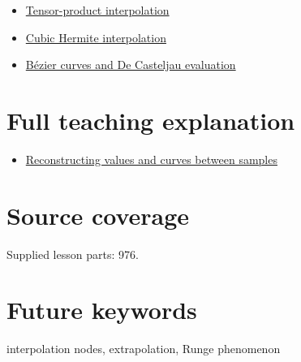 \begin{itemize}
\tightlist
\item
  \hyperref[appendix-0a09b6dfdc86]{Tensor-product interpolation}
\item
  \hyperref[appendix-db3aef8f2fd6]{Cubic Hermite interpolation}
\item
  \hyperref[appendix-ddbec701898c]{Bézier curves and De Casteljau evaluation}
\end{itemize}

\section{Full teaching explanation}\label{appendix-0c2a5f69851e-full-teaching-explanation}

\begin{itemize}
\tightlist
\item
  \href{Continuous\%20Notes/Computing\%20Foundations\%20-\%20From\%20Bits\%20to\%20C++\%20and\%20Systems\%20APIs\#Reconstructing\%20values\%20and\%20curves\%20between\%20samples}{Reconstructing values and curves between samples}
\end{itemize}

\section{Source coverage}\label{appendix-0c2a5f69851e-source-coverage}

Supplied lesson parts: 976.

\section{Future keywords}\label{appendix-0c2a5f69851e-future-keywords}

interpolation nodes, extrapolation, Runge phenomenon
